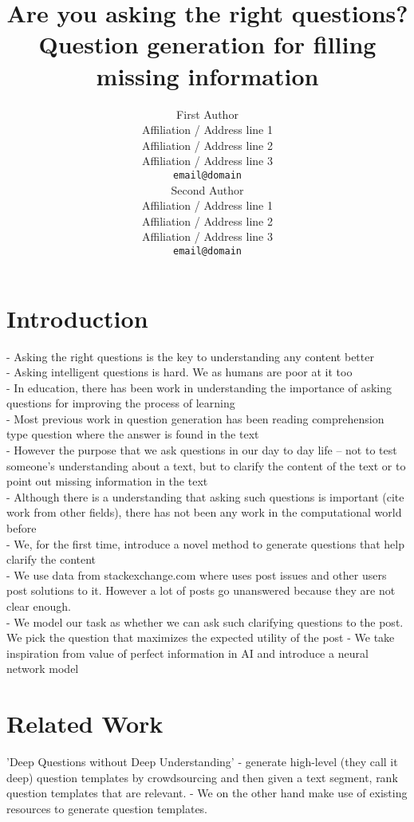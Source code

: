 \documentclass[11pt]{article}
\title{Are you asking the right questions? \\ Question generation for filling missing information}
\author{First Author \\
  Affiliation / Address line 1 \\
  Affiliation / Address line 2 \\
  Affiliation / Address line 3 \\
  {\tt email@domain} \\\And
  Second Author \\
  Affiliation / Address line 1 \\
  Affiliation / Address line 2 \\
  Affiliation / Address line 3 \\
  {\tt email@domain} \\}
\date{}
\begin{document}
\maketitle
\begin{abstract}

\end{abstract}


\section{Introduction}

- Asking the right questions is the key to understanding any content better \\
- Asking intelligent questions is hard. We as humans are poor at it too \\
- In education, there has been work in understanding the importance of asking questions for improving the process of learning \\
- Most previous work in question generation has been reading comprehension type question where the answer is found in the text \\
- However the purpose that we ask questions in our day to day life -- not to test someone's understanding about a text, but to clarify the content of the text or to point out missing information in the text \\
- Although there is a understanding that asking such questions is important (cite work from other fields), there has not been any work in the computational world before \\
- We, for the first time, introduce a novel method to generate questions that help clarify the content \\
- We use data from stackexchange.com where uses post issues and other users post solutions to it. However a lot of posts go unanswered because they are not clear enough. \\
- We model our task as whether we can ask such clarifying questions to the post.  We pick the question that maximizes the expected utility of the post
- We take inspiration from value of perfect information in AI and introduce a neural network model 

\section{Related Work} \label{related_work}

'Deep Questions without Deep Understanding' 
- generate high-level (they call it deep) question templates by crowdsourcing and then given a text segment, rank question templates that are relevant. 
- We on the other hand make use of existing resources to generate question templates. 
\end{document}
